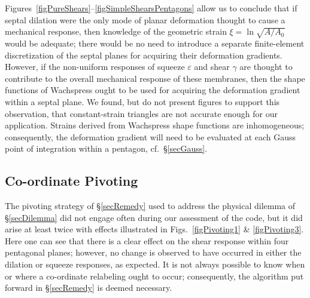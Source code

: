 Figures~\ref{figPureShears}--\ref{figSimpleShearsPentagons} allow us to conclude that if septal dilation were the only mode of planar deformation thought to cause a mechanical response, then knowledge of the geometric strain $\xi = \ln \sqrt{A/A_0}$ would be adequate; there would be no need to introduce a separate finite-element discretization of the septal planes for acquiring their deformation gradients.  However, if the non-uniform responses of squeeze $\varepsilon$ and shear $\gamma$ are thought to contribute to the overall mechanical response of these membranes, then the shape functions of Wachspress \cite{Wachspress75,Wachspress16} ought to be used for acquiring the deformation gradient within a septal plane.  We found, but do not present figures to support this observation, that constant-strain triangles are not accurate enough for our application.  Strains derived from Wachspress shape functions are inhomogeneous; consequently, the deformation gradient will need to be evaluated at each Gauss point of integration within a pentagon, cf.\ \S\ref{secGauss}.

\subsection{Co-ordinate Pivoting}

The pivoting strategy of \S\ref{secRemedy} used to address the physical dilemma of \S\ref{secDilemma} did not engage often during our assessment of the code, but it did arise at least twice with effects illustrated in Figs.~\ref{figPivoting1} \& \ref{figPivoting3}.  Here one can see that there is a clear effect on the shear response within four pentagonal planes; however, no change is observed to have occurred in either the dilation or squeeze responses, as expected.  It is not always possible to know when or where a co-ordinate relabeling ought to occur; consequently, the algorithm put forward in \S\ref{secRemedy} is deemed necessary.


